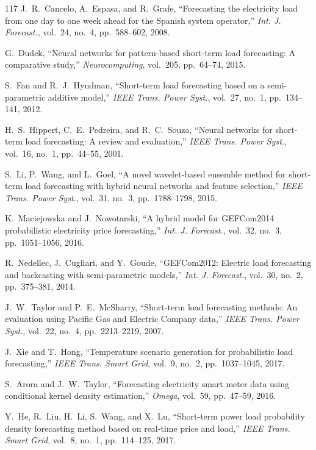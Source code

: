 \documentclass[12pt,a4paper]{article}
\begin{document}
\begin{thebibliography}{117}
 J.~R.~Cancelo, A.~Espasa, and R.~Grafe, ``Forecasting the electricity load from one day to one week ahead for the Spanish system operator,'' \textit{Int. J. Forecast.}, vol.~24, no.~4, pp.~588--602, 2008.

 G.~Dudek, ``Neural networks for pattern-based short-term load forecasting: A comparative study,'' \textit{Neurocomputing}, vol.~205, pp.~64--74, 2015.

 S.~Fan and R.~J.~Hyndman, ``Short-term load forecasting based on a semi-parametric additive model,'' \textit{IEEE Trans. Power Syst.}, vol.~27, no.~1, pp.~134--141, 2012.

 H.~S.~Hippert, C.~E.~Pedreira, and R.~C.~Souza, ``Neural networks for short-term load forecasting: A review and evaluation,'' \textit{IEEE Trans. Power Syst.}, vol.~16, no.~1, pp.~44--55, 2001.

 S.~Li, P.~Wang, and L.~Goel, ``A novel wavelet-based ensemble method for short-term load forecasting with hybrid neural networks and feature selection,'' \textit{IEEE Trans. Power Syst.}, vol.~31, no.~3, pp.~1788--1798, 2015.

 K.~Maciejowska and J.~Nowotarski, ``A hybrid model for GEFCom2014 probabilistic electricity price forecasting,'' \textit{Int. J. Forecast.}, vol.~32, no.~3, pp.~1051--1056, 2016.

 R.~Nedellec, J.~Cugliari, and Y.~Goude, ``GEFCom2012: Electric load forecasting and backcasting with semi-parametric models,'' \textit{Int. J. Forecast.}, vol.~30, no.~2, pp.~375--381, 2014.

 J.~W.~Taylor and P.~E.~McSharry, ``Short-term load forecasting methods: An evaluation using Pacific Gas and Electric Company data,'' \textit{IEEE Trans. Power Syst.}, vol.~22, no.~4, pp.~2213--2219, 2007.

 J.~Xie and T.~Hong, ``Temperature scenario generation for probabilistic load forecasting,'' \textit{IEEE Trans. Smart Grid}, vol.~9, no.~2, pp.~1037--1045, 2017.

 S.~Arora and J.~W.~Taylor, ``Forecasting electricity smart meter data using conditional kernel density estimation,'' \textit{Omega}, vol.~59, pp.~47--59, 2016.

 Y.~He, R.~Liu, H.~Li, S.~Wang, and X.~Lu, ``Short-term power load probability density forecasting method based on real-time price and load,'' \textit{IEEE Trans. Smart Grid}, vol.~8, no.~1, pp.~114--125, 2017.


\end{thebibliography}
\end{document}
